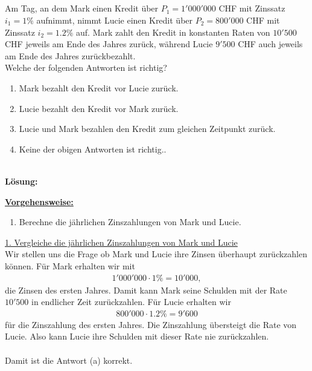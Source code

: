 \subsection*{}
Am Tag, an dem Mark einen Kredit über $ P_1= 1'000'000 $ CHF mit Zinssatz $ i_1 = 1 \% $ aufnimmt, nimmt Lucie einen Kredit über $ P_2= 800'000 $ CHF mit Zinssatz $ i_2 = 1.2 \% $ auf.
Mark zahlt den Kredit in konstanten Raten von $ 10'500 $ CHF jeweils am Ende des Jahres zurück, während Lucie $ 9'500 $ CHF auch jeweils am Ende des Jahres zurückbezahlt.\\
Welche der folgenden Antworten ist richtig?
\renewcommand{\labelenumi}{(\alph{enumi})}
\begin{enumerate}
	\item 
	Mark bezahlt den Kredit vor Lucie zurück.
	\item 
	Lucie bezahlt den Kredit vor Mark zurück.
	\item
	Lucie und Mark bezahlen den Kredit zum gleichen Zeitpunkt zurück.
	\item
	Keine der obigen Antworten ist richtig..
\end{enumerate}
\ \\
\textbf{Lösung:}
\begin{mdframed}
\underline{\textbf{Vorgehensweise:}}
\renewcommand{\labelenumi}{\theenumi.}
\begin{enumerate}
\item Berechne die jährlichen Zinszahlungen von Mark und Lucie.
\end{enumerate}
\end{mdframed}

\underline{1. Vergleiche die jährlichen Zinszahlungen von Mark und Lucie}\\
Wir stellen uns die Frage ob Mark und Lucie ihre Zinsen überhaupt zurückzahlen können. Für Mark erhalten wir mit 
\begin{align*}
	1'000'000 \cdot 1 \% = 10'000,
\end{align*}
die Zinsen des ersten Jahres.
Damit kann Mark seine Schulden mit der Rate $ 10'500 $ in endlicher Zeit zurückzahlen.
Für Lucie erhalten wir
\begin{align*}
	800'000 \cdot 1.2\% = 9'600
\end{align*}
für die Zinszahlung des ersten Jahres. Die Zinszahlung übersteigt die Rate von Lucie. Also kann Lucie ihre Schulden mit dieser Rate nie zurückzahlen.\\
\\
Damit ist die Antwort (a) korrekt.

